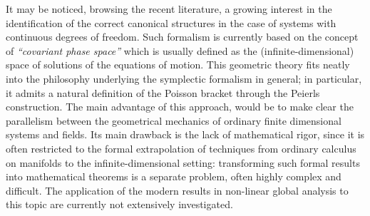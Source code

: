 \documentclass[Main]{subfiles}
\begin{document}
	It  may be noticed, browsing the recent literature, a growing interest in the identification of the correct canonical structures in the case of systems with continuous degrees of freedom.
	Such formalism is currently based on the concept of \emph{“covariant phase space”} which is usually defined as the (infinite-dimensional) space of solutions of the equations of motion. 
				This geometric theory fits neatly into the philosophy underlying the symplectic formalism in general; in particular, it admits a natural definition of the Poisson bracket through the Peierls construction.
		The main advantage of this approach, would be to make clear the parallelism between the geometrical mechanics of ordinary finite dimensional systems and fields. 
		Its main drawback is the lack of mathematical rigor, since it is often restricted to the formal extrapolation of techniques from ordinary calculus on manifolds to the infinite-dimensional setting: transforming such formal results into mathematical theorems is a separate problem, often highly complex and difficult.		
		The application of the modern results in non-linear global analysis to this topic are currently not extensively investigated.
	
\end{document}
